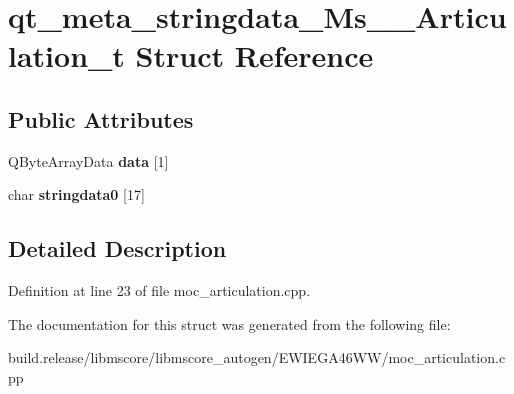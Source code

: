 \hypertarget{structqt__meta__stringdata___ms_____articulation__t}{}\section{qt\+\_\+meta\+\_\+stringdata\+\_\+\+Ms\+\_\+\+\_\+\+Articulation\+\_\+t Struct Reference}
\label{structqt__meta__stringdata___ms_____articulation__t}
\subsection*{Public Attributes}
\begin{DoxyCompactItemize}
\item 
\mbox{\label{structqt__meta__stringdata___ms_____articulation__t_ae41304455e0b5aad84e923c6cdd478fa}} 
Q\+Byte\+Array\+Data {\bfseries data} \mbox{[}1\mbox{]}
\item 
\mbox{\label{structqt__meta__stringdata___ms_____articulation__t_a258a2f48b93a9088517ef7c548cb6ab3}} 
char {\bfseries stringdata0} \mbox{[}17\mbox{]}
\end{DoxyCompactItemize}


\subsection{Detailed Description}


Definition at line 23 of file moc\+\_\+articulation.\+cpp.



The documentation for this struct was generated from the following file\+:\begin{DoxyCompactItemize}
\item 
build.\+release/libmscore/libmscore\+\_\+autogen/\+E\+W\+I\+E\+G\+A46\+W\+W/moc\+\_\+articulation.\+cpp\end{DoxyCompactItemize}
